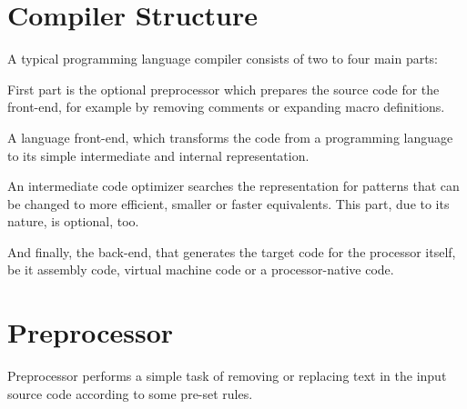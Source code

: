     \section{Compiler Structure}

    A typical programming language compiler consists of two to four main parts:

    First part is the optional preprocessor which prepares the source code for the front-end, for example by removing comments or expanding macro definitions.

    A language front-end, which transforms the code from a programming language to its simple intermediate and internal representation.

    An intermediate code optimizer searches the representation for patterns that can be changed to more efficient, smaller or faster equivalents. This part, due to its nature, is optional, too.

    And finally, the back-end, that generates the target code for the processor itself, be it assembly code, virtual machine code or a processor-native code.

    \begin{center}\end{center}

    \section{Preprocessor}

    Preprocessor performs a simple task of removing or replacing text in the input source code according to some pre-set rules.

